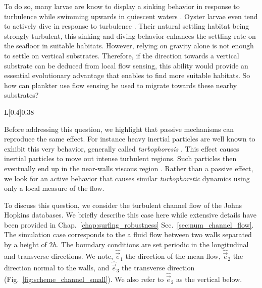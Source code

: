 To do so, many larvae are know to display a sinking behavior in response to turbulence while swimming upwards in quiescent waters \citep{fuchs2007effects, crimaldi2002hydrodynamics}.
Oyster larvae even tend to actively dive in response to turbulence \citep{fuchs2013active}.
Their natural settling habitat being strongly turbulent, this sinking and diving behavior enhances the settling rate on the seafloor in suitable habitats.
However, relying on gravity alone is not enough to settle on vertical substrates.
Therefore, if the direction towards a vertical substrate can be deduced from local flow sensing, this ability would provide an essential evolutionary advantage that enables to find more suitable habitats.
So how can plankter use flow sensing be used to migrate towards these nearby substrates?

\begin{wrapfigure}[10]{L}[0.4\width]{0.38\textwidth}
	\vspace{10pt}
	\centering
	\def\svgwidth{0.36\textwidth}
	
	\captionsetup{width=0.36\textwidth}
  	\caption{
  		Schematic of the channel flow of the Johns Hopkins Databases.
  	}
  	\label{fig:scheme_channel_small}
\end{wrapfigure}
Before addressing this question, we highlight that passive mechanisms can reproduce the same effect. 
For instance heavy inertial particles are well known to exhibit this very behavior, generally called \textit{turbophoresis} \citep{caporaloni1975transfer, reeks1983transport}.
This effect causes inertial particles to move out intense turbulent regions.
Such particles then eventually end up in the near-walls viscous region \citep{guha1997unified, guha2008transport, johnson2020turbophoresis}.
Rather than a passive effect, we look for an active behavior that causes similar \textit{turbophoretic} dynamics using only a local measure of the flow.

To discuss this question, we consider the turbulent channel flow of the Johns Hopkins databases.
We briefly describe this case here while extensive details have been provided in Chap.~\ref{chap:surfing_robustness} Sec.~\ref{sec:num_channel_flow}.
The simulation case corresponds to the a fluid flow between two walls separated by a height of $2h$.
The boundary conditions are set periodic in the longitudinal and transverse directions.
We note, $\hat{\vec{e}}_1$ the direction of the mean flow, $\hat{\vec{e}}_2$ the direction normal to the walls, and $\hat{\vec{e}}_3$ the transverse direction (Fig.~\ref{fig:scheme_channel_small}).
We also refer to $\hat{\vec{e}}_2$ as the vertical below.

